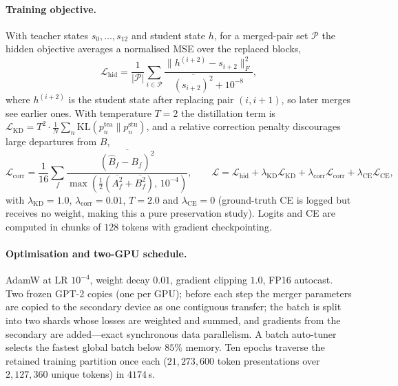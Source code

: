 \documentclass[10pt,a4paper]{article}
\newcommand{\ce}{\mathrm{CE}}
\begin{document}
\paragraph{Training objective.} With teacher states $s_0,\dots,s_{12}$ and student
state $h$, for a merged-pair set $\mathcal{P}$ the hidden objective averages a
normalised MSE over the replaced blocks,
\begin{equation}
\mathcal{L}_\text{hid}
= \frac{1}{|\mathcal{P}|}\sum_{i\in\mathcal{P}}
\frac{\bigl\lVert h^{(i+2)} - s_{i+2}\bigr\rVert_F^2}
{\overline{\left(s_{i+2}\right)^2} + 10^{-8}},
\end{equation}
where $h^{(i+2)}$ is the student state after replacing pair $(i,i+1)$, so later
merges see earlier ones. With temperature $T=2$ the distillation term is
$\mathcal{L}_\text{KD} = T^2 \cdot \frac{1}{N}\sum_{n}
\mathrm{KL}(p^\text{tea}_n \lVert p^\text{stu}_n)$, and a relative correction
penalty discourages large departures from $B$,
\begin{equation}
\mathcal{L}_\text{corr}
= \frac{1}{16}\sum_{f}\frac{\overline{(\hat B_f - B_f)^2}}
{\max\!\left(\tfrac{1}{2}(\overline{A_f^2}+\overline{B_f^2}),\,10^{-4}\right)},
\qquad
\mathcal{L} = \mathcal{L}_\text{hid} + \lambda_\text{KD}\mathcal{L}_\text{KD}
+ \lambda_\text{corr}\mathcal{L}_\text{corr} + \lambda_\ce\mathcal{L}_\ce,
\end{equation}
with $\lambda_\text{KD}=1.0$, $\lambda_\text{corr}=0.01$, $T=2.0$ and
$\lambda_\ce=0$ (ground-truth CE is logged but receives no weight, making this a
pure preservation study). Logits and CE are computed in chunks of $128$ tokens
with gradient checkpointing.

\paragraph{Optimisation and two-GPU schedule.} AdamW at LR $10^{-4}$, weight
decay $0.01$, gradient clipping $1.0$, FP16 autocast. Two frozen GPT-2 copies
(one per GPU); before each step the merger parameters are copied to the secondary
device as one contiguous transfer; the batch is split into two shards whose
losses are weighted and summed, and gradients from the secondary are added---exact
synchronous data parallelism. A batch auto-tuner selects the fastest global batch
below $85\%$ memory. Ten epochs traverse the retained training partition once each
($21{,}273{,}600$ token presentations over $2{,}127{,}360$ unique tokens) in
$4174$\,s.
\end{document}
